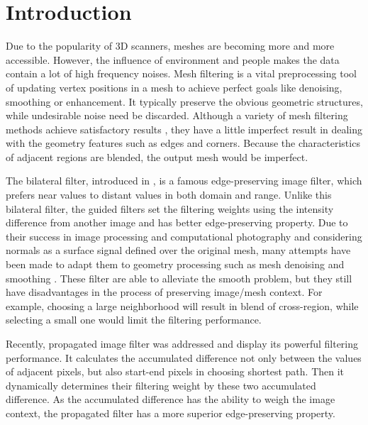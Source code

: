 \section{Introduction}

Due to the popularity of 3D scanners, meshes are becoming more and more accessible.
However, the influence of environment and people makes the data contain a lot of high frequency noises.
Mesh filtering is a vital preprocessing tool of updating vertex positions in a mesh to achieve perfect goals like denoising, smoothing or enhancement.
It typically preserve the obvious geometric structures, while undesirable noise need be discarded.
Although a variety of mesh filtering methods achieve satisfactory results \cite{fleishman2003bilateral, zheng2011bilateral},
they have a little imperfect result in dealing with the geometry features such as edges and corners.
Because the characteristics of adjacent regions are blended, the output mesh would be imperfect.

The bilateral filter, introduced in \cite{tomasi1998bilateral}, is a famous edge-preserving image filter, which prefers near values to distant values in both domain and range.
Unlike this bilateral filter, the guided filters \cite{Petschnigg2004, he2010guided} set the filtering weights using the intensity difference from another image and has better edge-preserving property.
Due to their success in image processing and computational photography and considering normals as a surface signal defined over the original mesh,
many attempts have been made to adapt them to geometry processing such as mesh denoising and smoothing \cite{jones2003non, zheng2011bilateral, Solomon2014general}.
These filter are able to alleviate the smooth problem, but they still have disadvantages in the process of preserving image/mesh context.
For example, choosing a large neighborhood will result in blend of cross-region, while selecting a small one would limit the filtering performance.

Recently,  propagated image filter \cite{Chang2015propagated} was addressed and display its powerful filtering performance.
It calculates the accumulated difference not only between the values of adjacent pixels, but also start-end pixels in choosing shortest path.
Then it dynamically determines their filtering weight by these two accumulated difference.
As the accumulated difference has the ability to weigh the image context, the propagated filter has a more superior edge-preserving property.

